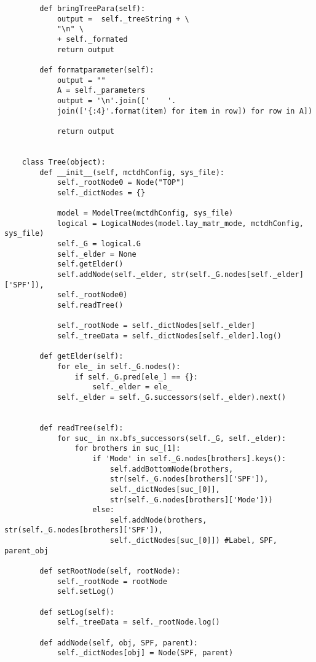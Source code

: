 \begin{verbatim}
        def bringTreePara(self):
            output =  self._treeString + \
            "\n" \
            + self._formated
            return output
    
        def formatparameter(self):
            output = ""
            A = self._parameters        
            output = '\n'.join(['    '.
            join(['{:4}'.format(item) for item in row]) for row in A])
    
            return output
    
    
    class Tree(object):
        def __init__(self, mctdhConfig, sys_file):
            self._rootNode0 = Node("TOP")
            self._dictNodes = {}
    
            model = ModelTree(mctdhConfig, sys_file)
            logical = LogicalNodes(model.lay_matr_mode, mctdhConfig, sys_file)
            self._G = logical.G
            self._elder = None
            self.getElder()
            self.addNode(self._elder, str(self._G.nodes[self._elder]['SPF']), 
            self._rootNode0)
            self.readTree()
    
            self._rootNode = self._dictNodes[self._elder]
            self._treeData = self._dictNodes[self._elder].log()
    
        def getElder(self):
            for ele_ in self._G.nodes():
                if self._G.pred[ele_] == {}:
                    self._elder = ele_
            self._elder = self._G.successors(self._elder).next()
    
    
        def readTree(self):
            for suc_ in nx.bfs_successors(self._G, self._elder):
                for brothers in suc_[1]:
                    if 'Mode' in self._G.nodes[brothers].keys():
                        self.addBottomNode(brothers, 
                        str(self._G.nodes[brothers]['SPF']), 
                        self._dictNodes[suc_[0]], 
                        str(self._G.nodes[brothers]['Mode']))
                    else:
                        self.addNode(brothers, str(self._G.nodes[brothers]['SPF']), 
                        self._dictNodes[suc_[0]]) #Label, SPF, parent_obj
    
        def setRootNode(self, rootNode):
            self._rootNode = rootNode
            self.setLog()
    
        def setLog(self):
            self._treeData = self._rootNode.log()
    
        def addNode(self, obj, SPF, parent):
            self._dictNodes[obj] = Node(SPF, parent)
    

\end{verbatim}
